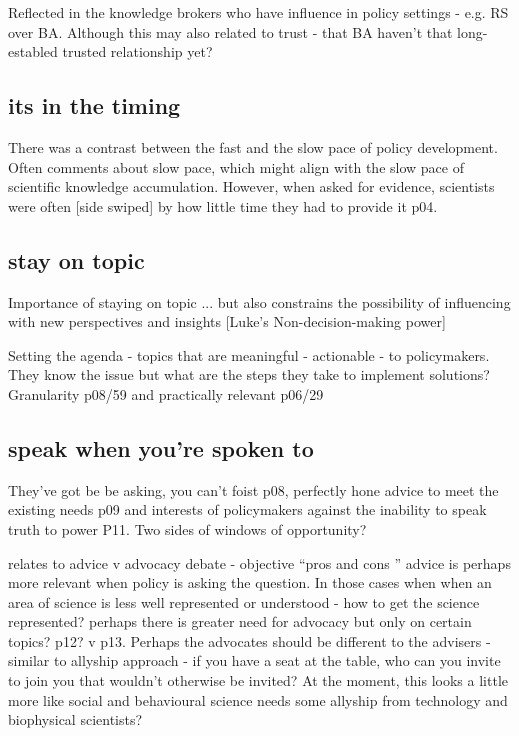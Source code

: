 Reflected in the knowledge brokers who have influence in policy settings - e.g. RS over BA. Although this may also related to trust - that BA haven't that long-establed trusted relationship yet?

\subsection{its in the timing}
There was a contrast between the fast and the slow pace of policy development. Often comments about slow pace, which might align with the slow pace of scientific knowledge accumulation. However, when asked for evidence, scientists were often [side swiped] by how little time they had to provide it p04.  

\subsection{stay on topic}
Importance of staying on topic ... but also constrains the possibility of influencing with new perspectives and insights [Luke's Non-decision-making power]

Setting the agenda - topics that are meaningful - actionable - to policymakers. They know the issue but what are the steps they take to implement solutions? Granularity p08/59 and practically relevant p06/29


\subsection{speak when you're spoken to}
They've got be be asking, you can't foist p08, perfectly hone advice to meet the existing needs p09 and interests of policymakers against the inability to speak truth to power P11. Two sides of windows of opportunity?

relates to advice v advocacy debate - objective ``pros and cons '' advice is perhaps more relevant when policy is asking the question. In those cases when when an area of science is less well represented or understood - how to get the science represented? perhaps there is greater need for advocacy but only on certain topics? p12? v p13. Perhaps the advocates should be different to the advisers - similar to allyship approach - if you have a seat at the table, who can you invite to join you that wouldn't otherwise be invited? At the moment, this looks a little more like social and behavioural science needs some allyship from technology and biophysical scientists?


